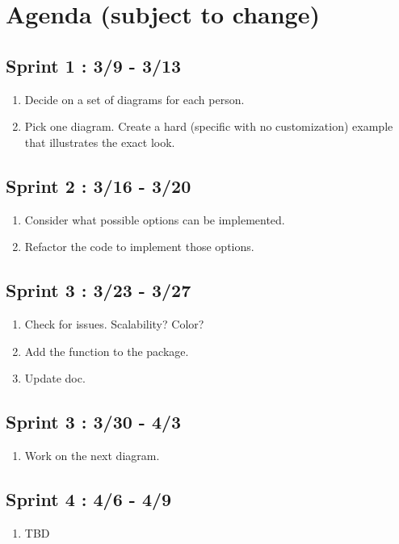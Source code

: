 \documentclass[10pt,a4paper,english]{article}
\begin{document}
\section*{Agenda \small{(subject to change)}}
\subsection{Sprint 1 : 3/9 - 3/13}
\begin{enumerate}
\item Decide on a set of diagrams for each person.
\item Pick one diagram. Create a hard (specific with no customization) example that illustrates the exact look.
\end{enumerate}
\subsection{Sprint 2 : 3/16 - 3/20}
\begin{enumerate}
\item Consider what possible options can be implemented.
\item Refactor the code to implement those options.
\end{enumerate}
\subsection{Sprint 3 : 3/23 - 3/27}
\begin{enumerate}
\item Check for issues. Scalability? Color? 
\item Add the function to the package.
\item Update doc.
\end{enumerate}
\subsection{Sprint 3 : 3/30 - 4/3}
\begin{enumerate}
\item Work on the next diagram.
\end{enumerate}
\subsection{Sprint 4 : 4/6 - 4/9}
\begin{enumerate}
\item TBD
\end{enumerate}
\end{document}
